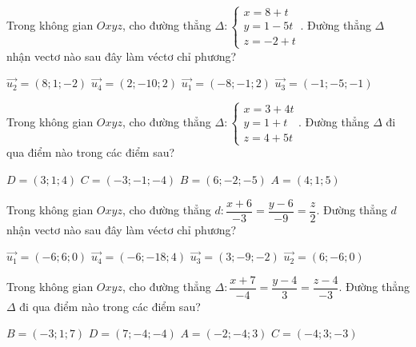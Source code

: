 \documentclass[12pt,a4paper]{article}
\begin{document}
\begin{ex}
 Trong không gian ${Oxyz}$, cho đường thẳng ${\Delta}:\left\{ \begin{array}{l}x = 8+t\\ y = 1-5t\\z = -2+t\end{array} \right.$. Đường thẳng ${\Delta}$ nhận vectơ nào sau đây làm véctơ chỉ phương?
 
\choice
{ $\overrightarrow{u_2}=(8;1;-2)$ }
   { \True $\overrightarrow{u_4}=(2;-10;2)$ }
     { $\overrightarrow{u_1}=(-8;-1;2)$ }
    { $\overrightarrow{u_3}=(-1;-5;-1)$ }
\end{ex}

\begin{ex}
 Trong không gian ${Oxyz}$, cho đường thẳng ${\Delta}:\left\{ \begin{array}{l}x = 3+4t\\ y = 1+t\\z = 4+5t\end{array} \right.$. Đường thẳng ${\Delta}$ đi qua điểm nào trong các điểm sau?
 
\choice
{ \True $D=(3;1;4)$ }
   { $C=(-3;-1;-4)$ }
     { $B=(6;-2;-5)$ }
    { $A=(4;1;5)$ }
\end{ex}

\begin{ex}
 Trong không gian ${Oxyz}$, cho đường thẳng ${d}:\dfrac{x + 6}{-3}=\dfrac{y - 6}{-9}=\dfrac{z}{2}$. Đường thẳng ${d}$ nhận vectơ nào sau đây làm véctơ chỉ phương?
 
\choice
{ $\overrightarrow{u_1}=(-6;6;0)$ }
   { \True $\overrightarrow{u_4}=(-6;-18;4)$ }
     { $\overrightarrow{u_3}=(3;-9;-2)$ }
    { $\overrightarrow{u_2}=(6;-6;0)$ }
\end{ex}

\begin{ex}
 Trong không gian ${Oxyz}$, cho đường thẳng ${\Delta}:\dfrac{x + 7}{-4}=\dfrac{y - 4}{3}=\dfrac{z - 4}{-3}$. Đường thẳng ${\Delta}$ đi qua điểm nào trong các điểm sau?
 
\choice
{ \True $B=(-3;1;7)$ }
   { $D=(7;-4;-4)$ }
     { $A=(-2;-4;3)$ }
    { $C=(-4;3;-3)$ }
\end{ex}
\end{document}
